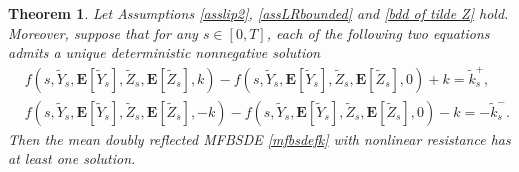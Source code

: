 \documentclass[10pt]{article}%
\numberwithin{equation}{section}
\newtheorem{theorem}{Theorem}[section]
\begin{document}
\begin{theorem}
Let Assumptions \ref{asslip2}, \ref{assLRbounded} and \eqref{bdd of tilde Z} hold. Moreover, suppose that for any $s\in[0,T]$, each of the following two equations admits a unique deterministic nonnegative solution
\begin{equation}\label{k+k-}
    \begin{split}
        &f(s,\widetilde{Y}_s,\mathbf{E}[\widetilde{Y}_s],\widetilde{Z}_s,\mathbf{E}[\widetilde{Z}_s],k)-f(s,\widetilde{Y}_s,\mathbf{E}[\widetilde{Y}_s],\widetilde{Z}_s,\mathbf{E}[\widetilde{Z}_s],0)+k=\widetilde{k}_s^+,\\
        &f(s,\widetilde{Y}_s,\mathbf{E}[\widetilde{Y}_s],\widetilde{Z}_s,\mathbf{E}[\widetilde{Z}_s],-k)-f(s,\widetilde{Y}_s,\mathbf{E}[\widetilde{Y}_s],\widetilde{Z}_s,\mathbf{E}[\widetilde{Z}_s],0)-k=-\widetilde{k}_s^-.
    \end{split}
\end{equation}
Then the mean doubly reflected MFBSDE \eqref{mfbsdefk} with nonlinear resistance has at least one solution. 
\end{theorem}
\end{document}
